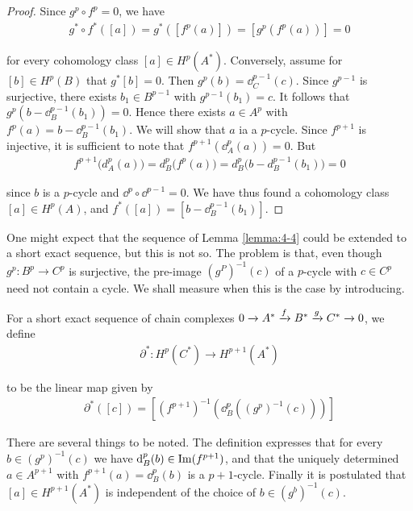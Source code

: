 \begin{proof}
  Since $g^p\circ f^p=0$, we have
  \begin{align*}
    g^*\circ f^*([ a ])=g^*([f^p(a)])=[g^p(f^p(a))]=0
  \end{align*}

  for every cohomology class $[a]\in H^p(A^*)$. Conversely, assume for $[b]\in H^p(B)$ that
  $g^*[b] = 0$. Then $g^p(b) = \dd^{p-1}_C(c)$. Since $g^{p-1}$ is surjective, there exists
  $b_1\in B^{p-1}$ with $g^{p-1}(b_1) = c$. It follows that $g^p(b-\dd^{p-1}_B(b_1)) = 0$. Hence
  there exists $a\in A^p$ with $f^p(a) = b-\dd^{p-1}_B(b_1)$. We will show that $a$ ia a $p$-cycle.
  Since $f^{p+1}$ is injective, it is sufficient to note that $f^{p+1}(\dd^p_A(a)) = 0$. But
  \begin{align*}
    f^{p+1}\big(d_A^p(a)\big)=d_B^p\big(f^p(a)\big)=d_B^p\big(b-d_B^{p-1}(b_1)\big) = 0
  \end{align*}

  since $b$ is a $p$-cycle and $\dd^p\circ\dd^{p-1} = 0$. We have thus found a cohomology class
  $[a]\in H^p(A)$, and $f^*([a]) = [b - \dd^{p-1}_B(b_1)]$.
\end{proof}


One might expect that the sequence of Lemma \ref{lemma:4-4} could be extended to a short
exact sequence, but this is not so. The problem is that, even though $g^p:B^p\to C^p$
is surjective, the pre-image $(g^P)^{-1}(c)$ of a $p$-cycle with $c\in C^p$ need not contain
a cycle. We shall measure when this is the case by introducing.


\begin{definition}
  For a short exact sequence of chain complexes $0\xrightarrow[]{}A^*\xrightarrow[]{f}B^*\xrightarrow[]{g}C^*\xrightarrow[]{}0$, we define
  \begin{align*}
    \partial^*: H^p(C^*) \to H^{p+1}(A^*)
  \end{align*}

  to be the linear map given by
  \begin{align*}
    \partial^*([c]) = \left[\left(f^{p+1}\right)^{-1} \left(\dd^p_B\left((g^p)^{-1}(c)\right)\right)\right]
  \end{align*}
\end{definition}

There are several things to be noted. The definition expresses that for every $b\in (g^p)^{-1}(c)$ we have
$\mathrm{d}^p_B(b)\in\operatorname{Im}(f^{p+1})$, and that the uniquely determined $a\in A^{p+1}$ with $f^{p+1}(a) = \dd^p_B(b)$ is a
$p+1$-cycle. Finally it is postulated that $[a]\in H^{p+1}(A^*)$ is independent of the choice of $b\in (g^b)^{-1}(c)$.

